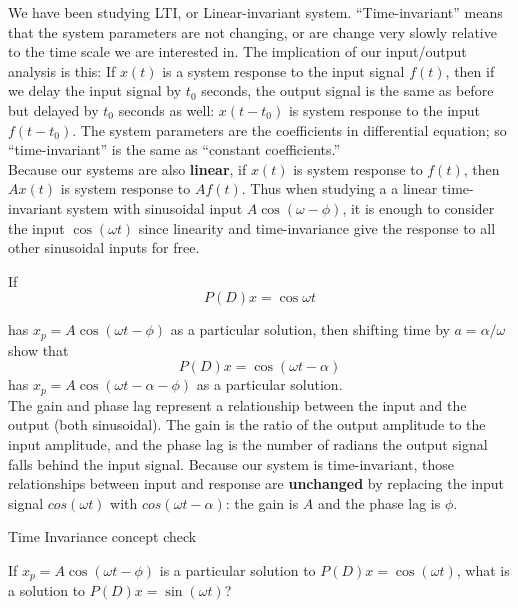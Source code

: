 We have been studying LTI, or Linear-invariant system.
``Time-invariant'' means that the system parameters are not changing,
or are change very slowly relative to the time scale we are interested in.
The implication of our input/output analysis is this:
If $x(t)$ is a system response to the input signal $f(t)$,
then if we delay the input signal by $t_0$ seconds, the output signal is the same
as before but delayed by $t_0$ seconds as well: $x(t - t_0)$ is system response
to the input $f(t - t_0)$. The system parameters are the coefficients
in differential equation; so ``time-invariant'' is the same as ``constant coefficients.''\\

Because our systems are also \textbf{linear}, if $x(t)$ is system response to $f(t)$,
then $Ax(t)$ is system response to $Af(t)$. Thus when studying a a linear time-invariant
system with sinusoidal input $A \cos (\omega - \phi)$, it is enough to consider
the input $\cos (\omega t)$ since linearity and time-invariance give the response
to all other sinusoidal inputs for free.

\begin{example}
  If
  \begin{equation*}
    P(D) x = \cos \omega t
  \end{equation*}
\end{example}
has $x_ p = A \cos (\omega t - \phi )$ as a particular solution, then shifting time by
$a = \alpha / \omega$ show that
\begin{equation*}
  P(D) x = \cos (\omega t - \alpha )
\end{equation*}
has $x_ p = A \cos (\omega t - \alpha - \phi )$ as a particular solution. \\

The gain and phase lag represent a relationship between the input and the output (both sinusoidal).
The gain is the ratio of the output amplitude to the input amplitude,
and the phase lag is the number of radians the output signal falls behind the input signal.
Because our system is time-invariant, those relationships between input and response are
\textbf{unchanged} by replacing the input signal $cos(\omega t)$ with $cos(\omega t - \alpha)$:
the gain is $A$ and the phase lag is $\phi$.\\

\begin{exercise}
  Time Invariance concept check
\end{exercise}

If $x_ p = A\cos (\omega t - \phi )$ is a particular solution to $P(D)x = \cos (\omega t)$, 
what is a solution to $P(D) x = \sin (\omega t)$?\\

